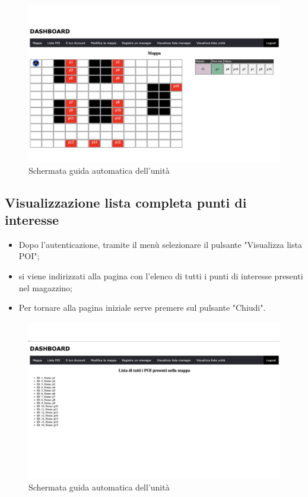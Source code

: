 \begin{figure}[H]
    \centering
    \includegraphics[scale=0.12]{res/images/map_user.png}
    \caption{Schermata guida automatica dell'unità}
\end{figure}

\subsection{Visualizzazione lista completa punti di interesse}
\begin{itemize}
    \item Dopo l'autenticazione, tramite il menù selezionare il pulsante "Visualizza lista POI";
    \item si viene indirizzati alla pagina con l'elenco di tutti i punti di interesse presenti nel magazzino;
    \item Per tornare alla pagina iniziale serve premere sul pulsante "Chiudi".
\end{itemize}

\begin{figure}[H]
    \centering
    \includegraphics[scale=0.12]{res/images/listpoi_user.png}
    \caption{Schermata guida automatica dell'unità}
\end{figure}


